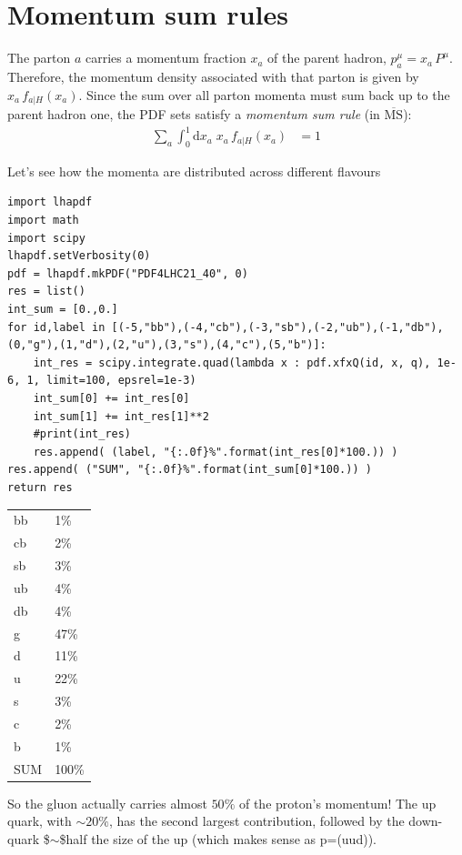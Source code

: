 \documentclass[11pt]{article}
\begin{document}
\section{Momentum sum rules}
\label{sec:org6eeb58f}
The parton \(a\) carries a momentum fraction \(x_a\) of the parent hadron, \(p_a^\mu=x_a\,P^\mu\).
Therefore, the momentum density associated with that parton is given by \(x_a\,f_{a\vert H}(x_a)\).
Since the sum over all parton momenta must sum back up to the parent hadron one, the PDF sets satisfy a \emph{momentum sum rule} (in \(\overline{\text{MS}}\)):
\begin{align}
  \sum_a \int_0^1 \mathrm{d}x_a \; x_a\,f_{a\vert H}(x_a)
  &= 1
\end{align}

Let's see how the momenta are distributed across different flavours
\begin{verbatim}
import lhapdf
import math
import scipy
lhapdf.setVerbosity(0)
pdf = lhapdf.mkPDF("PDF4LHC21_40", 0)
res = list()
int_sum = [0.,0.]
for id,label in [(-5,"bb"),(-4,"cb"),(-3,"sb"),(-2,"ub"),(-1,"db"),(0,"g"),(1,"d"),(2,"u"),(3,"s"),(4,"c"),(5,"b")]:
    int_res = scipy.integrate.quad(lambda x : pdf.xfxQ(id, x, q), 1e-6, 1, limit=100, epsrel=1e-3)
    int_sum[0] += int_res[0]
    int_sum[1] += int_res[1]**2
    #print(int_res)
    res.append( (label, "{:.0f}%".format(int_res[0]*100.)) )
res.append( ("SUM", "{:.0f}%".format(int_sum[0]*100.)) )
return res
\end{verbatim}

\begin{table}[htbp]
\label{}
\centering
\begin{tabular}{ll}
bb & 1\%\\
cb & 2\%\\
sb & 3\%\\
ub & 4\%\\
db & 4\%\\
g & 47\%\\
d & 11\%\\
u & 22\%\\
s & 3\%\\
c & 2\%\\
b & 1\%\\
SUM & 100\%\\
\end{tabular}
\end{table}

So the gluon actually carries almost \(50\%\) of the proton's momentum!
The up quark, with \(\sim20\%\), has the second largest contribution, followed by the down-quark \$\(\sim\)\$half the size of the up (which makes sense as p=(uud)).
\end{document}
